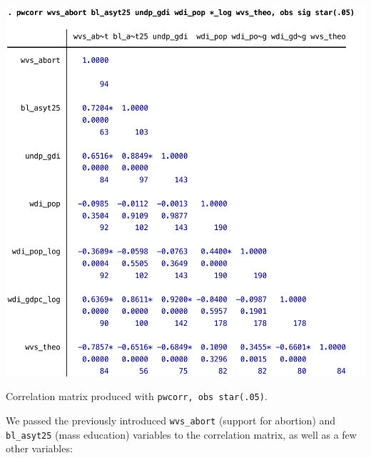 \begin{table}[htp]
	\includegraphics[scale=.5]{images/abortion_pwcorr.pdf}

	\caption[Correlation matrix with ]{\label{tbl:pwcorr}
	Correlation matrix produced with \texttt{pwcorr, obs star(.05)}.\\
	}
\end{table}%

We passed the previously introduced \texttt{wvs\_abort} (support for abortion) and \texttt{bl\_asyt25} (mass education) variables to the correlation matrix, as well as a few other variables:

